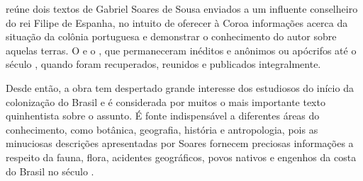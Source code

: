 \hspace*{-7cm}\hrulefill\hspace*{-7cm}

\medskip

 reúne dois textos de
Gabriel Soares de Sousa enviados a um influente conselheiro do rei
Filipe  de Espanha, no intuito de oferecer à Coroa informações acerca
da situação da colônia portuguesa e demonstrar o conhecimento do autor
sobre aquelas terras.  O {} e o {}, que permaneceram
inéditos e anônimos ou apócrifos até o século , quando foram
recuperados, reunidos e publicados integralmente.

Desde então, a obra tem despertado grande interesse dos estudiosos do
início da colonização do Brasil e é considerada por muitos o mais
importante texto quinhentista sobre o assunto. É fonte indispensável a
diferentes áreas do conhecimento, como botânica, geografia, história e
antropologia, pois as minuciosas descrições apresentadas por Soares
fornecem preciosas informações a respeito da fauna, flora, acidentes
geográficos, povos nativos e engenhos da costa do Brasil no
século .

\vfill

\hspace*{-.4cm}\begin{minipage}[c]{.6\linewidth}
\small{
{}}
\end{minipage}

\pagebreak %

